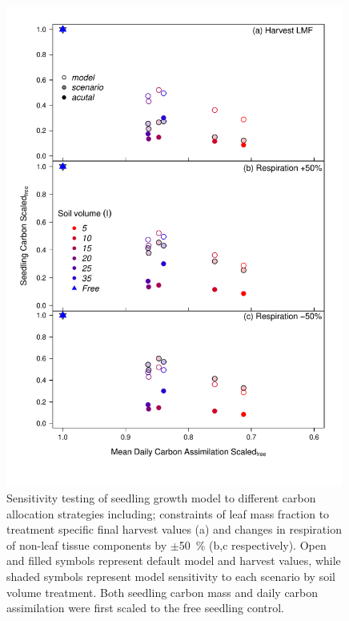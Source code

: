\documentclass[a4paper]{article}\usepackage[]{graphicx}\usepackage[]{color}
\begin{document}
\begin{figure}[h!]
    \centering
    \includegraphics[width=0.99\textwidth]{massmodel_resp.pdf}
    \caption{Sensitivity testing of seedling growth model to different carbon allocation strategies including; constraints of leaf mass fraction to treatment specific final harvest values (a) and changes in respiration of non-leaf tissue components by  $\pm$50~\% (b,c respectively).  Open and filled symbols represent default model and harvest values, while shaded symbols represent model sensitivity to each scenario by soil volume treatment. Both seedling carbon mass and daily carbon assimilation were first scaled to the free seedling control.}
    \label{fig:figureSI1}
\end{figure}
\end{document}
